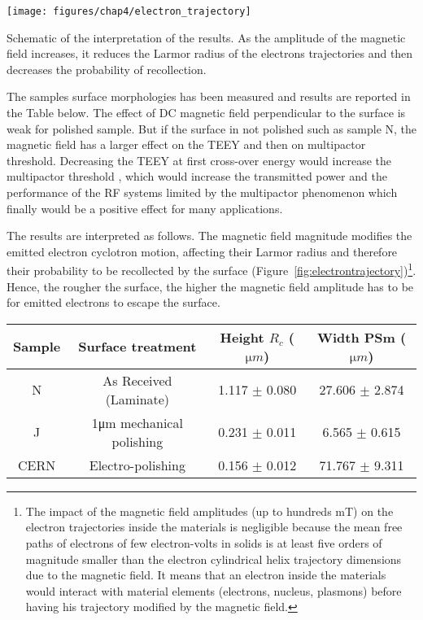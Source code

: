 \begin{marginfigure}
	\centering
	\texttt{[image: figures/chap4/electron\_trajectory]}
	\caption{Schematic of the interpretation of the results. As the amplitude of the magnetic field increases, it reduces the Larmor radius of the electrons trajectories and then decreases the probability of recollection.}
	\label{fig:electrontrajectory}
\end{marginfigure}

The samples surface morphologies has been measured and results are reported in the Table below. The effect of DC magnetic field perpendicular to the surface is weak for polished sample. But if the surface in not polished such as sample N, the magnetic field has a larger effect on the TEEY and then on multipactor threshold. Decreasing the TEEY at first cross-over energy would increase the multipactor threshold \cite{fil2016}, which would increase the transmitted power and the performance of the RF systems limited by the multipactor phenomenon which finally would be a positive effect for many applications.

The results are interpreted as follows. The magnetic field magnitude modifies the emitted electron cyclotron motion, affecting their Larmor radius and therefore their probability to be recollected by the surface (Figure~\ref{fig:electrontrajectory})\footnote{The impact of the magnetic field amplitudes (up to hundreds \si{\milli T}) on the electron trajectories inside the materials is negligible because the mean free paths of electrons of few electron-volts in solids is at least five orders of magnitude smaller than the electron cylindrical helix trajectory dimensions due to the magnetic field. It means that an electron inside the materials would interact with material elements (electrons, nucleus, plasmons) before having his trajectory modified by the magnetic field.}. Hence, the rougher the surface, the higher the magnetic field amplitude has to be for emitted electrons to escape the surface.


\begin{table}
\begin{tabular}{|c|c|c|c|}
	\hline
	Sample &  Surface treatment & Height $R_c$ ($\si{\micro m}$) & Width PSm ($\si{\micro m}$) \\
	\hline
	N & As Received (Laminate) & 1.117 $\pm$ 0.080 & 27.606 $\pm$ 2.874 \\
	\hline
	J & 1\si{\micro m} mechanical polishing & 0.231 $\pm$ 0.011 & 6.565 $\pm$ 0.615 \\
	\hline
	CERN & Electro-polishing &  0.156 $\pm$ 0.012 & 71.767 $\pm$ 9.311 \\
	\hline
\end{tabular}
\end{table}


